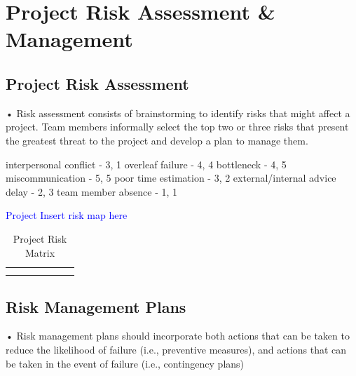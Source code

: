 \chapter{Project Risk Assessment \& Management}

\section{Project Risk Assessment}

• Risk assessment consists of brainstorming to identify risks that might
affect a project. Team members informally select the top two or three
risks that present the greatest threat to the project and develop a plan
to manage them.

interpersonal conflict - 3, 1 
overleaf failure - 4, 4
bottleneck - 4, 5
miscommunication - 5, 5
poor time estimation - 3, 2
external/internal advice delay - 2, 3 
team member absence - 1, 1




\textcolor{blue}{Project Insert risk map here}
\begin{table}[h]
    \centering
        \caption{Project Risk Matrix}
    \begin{tabular}{|c|c|c|c|c|c|c|}
         &  \\
         & 
    \end{tabular}
    \label{tab:placeholder}
\end{table}

\section{Risk Management Plans}
• Risk management plans should incorporate both actions that can be
taken to reduce the likelihood of failure (i.e., preventive measures),
and actions that can be taken in the event of failure (i.e., contingency
plans)